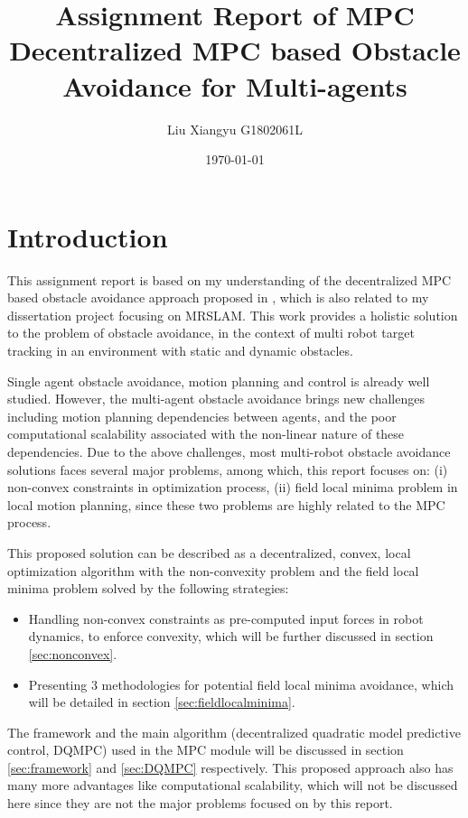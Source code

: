 \documentclass[12pt]{article}
\begin{document}
\title{Assignment Report of MPC\\
	 \large Decentralized MPC based Obstacle Avoidance for Multi-agents}
\author{Liu Xiangyu G1802061L}
\date{\today}
\maketitle

\section{Introduction}
This assignment report is based on my understanding of the decentralized MPC based obstacle avoidance approach proposed in \cite{tallamraju2018decentralized}, which is also related to my dissertation project focusing on MRSLAM. This work provides a holistic solution to the problem of obstacle avoidance, in the context of multi robot target tracking in an environment with static and dynamic obstacles.

Single agent obstacle avoidance, motion planning and control is already well studied. However, the multi-agent obstacle avoidance brings new challenges including motion planning dependencies between agents, and the poor computational scalability associated with the non-linear nature of these dependencies. Due to the above challenges, most multi-robot obstacle avoidance solutions faces several major problems, among which, this report focuses on: (i) non-convex constraints in optimization process, (ii) field local minima problem in local motion planning, since these two problems are highly related to the MPC process.

 This proposed solution can be described as a decentralized, convex, local optimization algorithm with the non-convexity problem and the field local minima problem solved by the following strategies:

\begin{itemize}
\item Handling non-convex constraints as pre-computed input forces in robot dynamics, to enforce convexity, which will be further discussed in section \ref{sec:nonconvex}.
\item Presenting 3 methodologies for potential field local minima avoidance, which will be detailed in section \ref{sec:fieldlocalminima}.
\end{itemize}

The framework and the main algorithm (decentralized quadratic model predictive control, DQMPC) used in the MPC module will be discussed in section \ref{sec:framework} and \ref{sec:DQMPC} respectively. This proposed approach also has many more advantages like computational scalability, which will not be discussed here since they are not the major problems focused on by this report.
\end{document}
